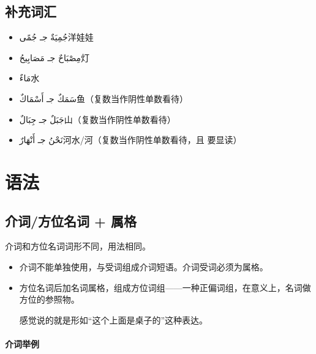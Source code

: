 \subsection{补充词汇}

\begin{itemize}
    \item \ac{جُمِيَةٌ جـ جُمًى}{洋娃娃}
    \item \ac{مِصْبَاحٌ جـ مَصَابِيحُ}{灯}
    \item \ac{مَاءٌ}{水}
    \item \ac{سَمَكٌ جـ أَسْمَاكٌ}{鱼（复数当作阴性单数看待）}
    \item \ac{جَبَلٌ جـ جِبَالٌ}{山（复数当作阴性单数看待）}
    \item \ac{نَحْنُ جـ أَنْهَارٌ}{河水/河（复数当作阴性单数看待，且  要显读）}
\end{itemize}

\section{语法}

\subsection{介词/方位名词 + 属格}

介词和方位名词词形不同，用法相同。

\begin{itemize}
    \item 介词不能单独使用，与受词组成介词短语。介词受词必须为属格。
    \item 方位名词后加名词属格，组成方位词组——一种正偏词组，在意义上，名词做方位的参照物。
    \begin{note}
    感觉说的就是形如``这个上面是桌子的''这种表达。
    \end{note}
\end{itemize}

\paragraph{介词举例}

